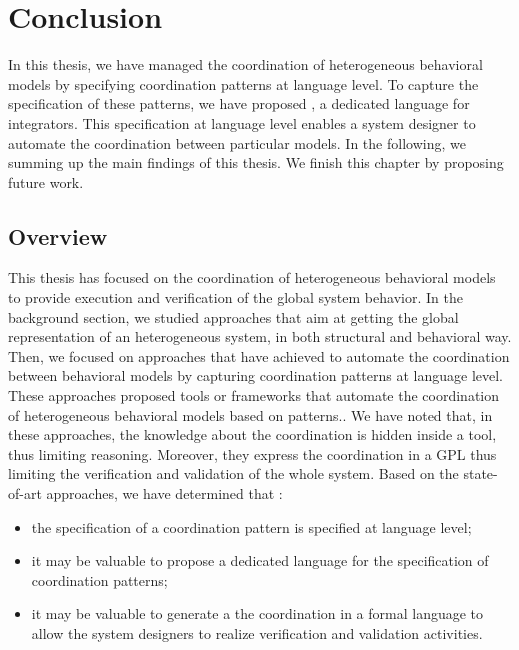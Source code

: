 \chapter{Conclusion}
\label{ch:conclusions}
In this thesis, we have managed the coordination of heterogeneous behavioral models by specifying coordination patterns at language level. To capture the specification of these patterns, we have proposed \bcool, a dedicated language for integrators. This specification at language level enables a system designer to automate the coordination between particular models. In the following, we summing up the main findings of this thesis. We finish this chapter by proposing future work.    

\section{Overview}
	
	
This thesis has focused on the coordination of heterogeneous behavioral models to provide execution and verification of the global system behavior. In the background section, we studied approaches that aim at getting the global representation of an heterogeneous system, in both structural and behavioral way. Then, we focused on approaches that have achieved to automate the coordination between behavioral models by capturing coordination patterns at language level. These approaches proposed tools or frameworks that automate the coordination of heterogeneous behavioral models based on patterns.. We have noted that, in these approaches, the knowledge about the coordination is hidden inside a tool, thus limiting reasoning. Moreover, they express the coordination in a GPL thus limiting the verification and validation of the whole system. Based on the state-of-art approaches, we have determined that  :
	\begin{itemize}

	\item the specification of a coordination pattern is specified at language level;
	 
	\item it may be valuable to propose a dedicated language for the specification of coordination patterns; 
	 
	\item it may be valuable to generate a the coordination in a formal language to allow the system designers to realize verification and validation activities.
	
\end{itemize}
	  
